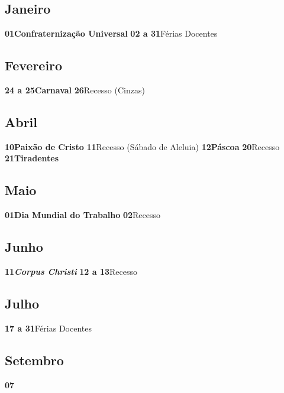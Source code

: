 \documentclass[thesis]{hmcposter}
\begin{document}
\begin{poster}
	\newpage\subsection{Janeiro}\textbf{01}\quad \quad \quad \quad \textbf{Confraternização Universal} \newline\textbf{02 a 31}\quad \quad Férias Docentes \subsection{Fevereiro}\textbf{24 a 25}\quad \quad \textbf{Carnaval} \newline\textbf{26}\quad \quad \quad \quad Recesso (Cinzas) \subsection{Abril}\textbf{10}\quad \quad \quad \quad \textbf{Paixão de Cristo} \newline\textbf{11}\quad \quad \quad \quad Recesso (Sábado de Aleluia) \newline\textbf{12}\quad \quad \quad \quad \textbf{Páscoa} \newline\textbf{20}\quad \quad \quad \quad Recesso \newline\textbf{21}\quad \quad \quad \quad \textbf{Tiradentes} \subsection{Maio}\textbf{01}\quad \quad \quad \quad \textbf{Dia Mundial do Trabalho} \newline\textbf{02}\quad \quad \quad \quad Recesso \subsection{Junho}\textbf{11}\quad \quad \quad \quad \textbf{\textit{Corpus Christi}} \newline\textbf{12 a 13}\quad \quad Recesso \subsection{Julho}\textbf{17 a 31}\quad \quad Férias Docentes \subsection{Setembro}\textbf{07}\quad \quad 
\end{poster}
\end{document}
